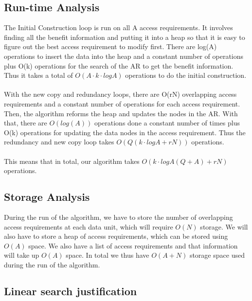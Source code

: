 \documentclass[conference]{acmsiggraph}
\begin{document}
\subsection{Run-time Analysis}

The Initial Construction loop is run on all A access requirements. It involves finding all the benefit information and putting it into a heap so that it is easy to figure out the best access requirement to modify first. There are log(A) operations to insert the data into the heap and a constant number of operations plus O(k) operations for the search of the AR to get the benefit information. Thus it takes a total of $O(A \cdot k \cdot logA)$ operations to do the initial construction. \\
\\
With the new copy and redundancy loops, there are O(rN) overlapping access requirements and a constant number of operations for each access requirement. Then, the algorithm reforms the heap and updates the nodes in the AR. With that, there are $O(log(A))$ operations done a constant number of times plus O(k) operations for updating the data nodes in the access requirement. Thus the redundancy and new copy loop takes $O(Q(k \cdot logA + rN))$ operations. \\
\\
This means that in total, our algorithm takes $O( k \cdot logA (Q+A) + rN)$ operations. 

\subsection{Storage Analysis}

During the run of the algorithm, we have to store the number of overlapping access requirements at each data unit, which will require $O(N)$ storage. We will also have to store a heap of access requirements, which can be stored using $O(A)$ space. We also have a list of access requirements and that information will take up $O(A)$ space. In total we thus have $O(A + N)$ storage space used during the run of the algorithm. 


\subsection{Linear search justification}
\end{document}
